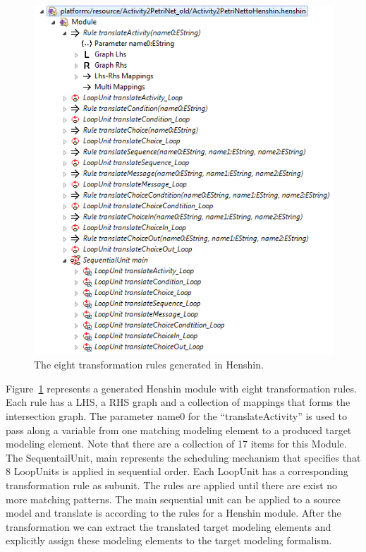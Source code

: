 \begin{figure}[H]
	\centering
	\includegraphics[scale=0.7]{./Figures/henshin_rules.png}
	\caption[A collection of a set of produced Henshin rules]
	{The eight transformation rules generated in Henshin.}
	\label{fig:henshin_rules}
\end{figure}

Figure~\ref{fig:henshin_rules} represents a generated Henshin module with eight
transformation rules. Each rule has a LHS, a RHS graph and a collection of
mappings that forms the intersection graph. The parameter name0 for the
``translateActivity'' is used to pass along a variable from one matching
modeling element to a produced target modeling element. Note that there are a
collection of 17 items for this Module. The SequentailUnit, main represents the
scheduling mechanism that specifies that 8 LoopUnits is applied in sequential
order. Each LoopUnit has a corresponding transformation rule as subunit. The
rules are applied until there are exist no more matching patterns. The main
sequential unit can be applied to a source model and translate is according to
the rules for a Henshin module. After the transformation we can extract the
translated target modeling elements and explicitly assign these modeling
elements to the target modeling formalism. 

